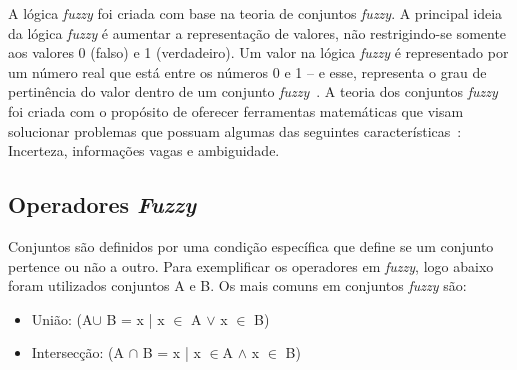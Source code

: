 \documentclass[12pt]{article}
\begin{document}
A lógica \textit{fuzzy} foi criada com base na teoria de conjuntos \textit{fuzzy}. A principal ideia da lógica \textit{fuzzy} é aumentar a representação de valores, não restrigindo-se somente aos valores 0 (falso) e 1 (verdadeiro). Um valor na lógica \textit{fuzzy} é representado por um número real que está entre os números 0 e 1 -- e esse, representa o grau de pertinência do valor dentro de um conjunto \textit{fuzzy}~\cite{boclin:06}. A teoria dos conjuntos \textit{fuzzy} foi criada com o propósito de oferecer ferramentas matemáticas que visam solucionar problemas que possuam algumas das seguintes características~\cite{falcao:02}: Incerteza, informações vagas e ambiguidade.


\subsection{Operadores \textit{Fuzzy}}
Conjuntos são definidos por uma condição específica que define se um conjunto pertence ou não a outro. Para exemplificar os operadores em \textit{fuzzy}, logo abaixo foram utilizados conjuntos A e B.
Os mais comuns em conjuntos \textit{fuzzy} são: 

\begin{itemize}
	\item União: (A\begin{math} \cup \end{math} B = x | x \begin{math}\in \end{math} A \begin{math}\vee \end{math} x \begin{math}\in \end{math} B)
	\item Intersecção: (A \begin{math} \cap \end{math} B = x | x \begin{math}\in \end{math}A \begin{math}\wedge \end{math} x \begin{math}\in \end{math} B)
\end{itemize}
\end{document}
